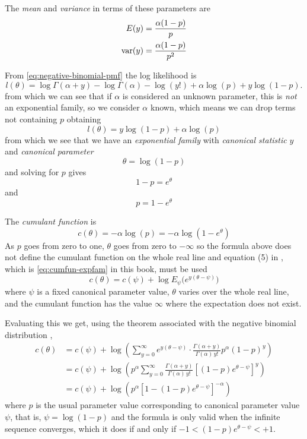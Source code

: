 The \emph{mean} and \emph{variance} in terms of these parameters are
\begin{align*}
   E(y) & = \frac{\alpha (1 - p)}{p}
   \\
   \operatorname{var}(y) & = \frac{\alpha (1 - p)}{p^2}
\end{align*}

From \eqref{eq:negative-binomial-pmf} the log likelihood is
$$
   l(\theta)
   =
   \log \Gamma(\alpha + y) - \log \Gamma(\alpha) - \log(y!)
   + \alpha \log(p) + y \log(1-p).
$$
from which we can see that if $\alpha$ is considered an unknown parameter,
this is \emph{not} an exponential family, so we consider $\alpha$ known,
which means we can drop terms not containing $p$ obtaining
$$
   l(\theta)
   =
   y \log(1 - p) + \alpha \log(p) 
$$
from which we see that we have an \emph{exponential family} with
\emph{canonical statistic} $y$ and \emph{canonical parameter}
$$
   \theta = \log(1 - p)
$$
and solving for $p$ gives
$$
   1 - p = e^\theta
$$
and
$$
   p = 1 - e^\theta
$$

The \emph{cumulant function} is
$$
   c(\theta)
   =
   - \alpha \log(p) 
   =
   - \alpha \log(1 - e^\theta)
$$
As $p$ goes from zero to one, $\theta$ goes from zero to $- \infty$ so
the formula above does not define the cumulant function on the whole real
line and equation (5) in \citet{geyer-gdor}, which is \eqref{eq:cumfun-expfam}
in this book, must be used
\begin{equation*}
   c(\theta) = c(\psi) +
   \log E_{\psi}\bigl( e^{y (\theta - \psi)} \bigr)
\end{equation*}
where $\psi$ is a fixed canonical parameter value, $\theta$ varies
over the whole real line, and the cumulant function has the value $\infty$
where the expectation does not exist.

Evaluating this we get, using the theorem associated with the negative
binomial distribution \citep{brand-name-distributions},
\begin{equation} \label{eq:negative-binomial-cumfun-derivation}
\begin{split}
   c(\theta)
   & =
   c(\psi) +
   \log \left( \sum_{y = 0}^\infty
   e^{y (\theta - \psi)} \cdot
   \frac{\Gamma(\alpha + y)}{\Gamma(\alpha) \, y!} p^\alpha (1-p)^y
   \right)
   \\
   & =
   c(\psi) +
   \log \left(
   p^\alpha
   \sum_{y = 0}^\infty
   \frac{\Gamma(\alpha + y)}{\Gamma(\alpha) \, y!}
   \left[ (1-p) e^{\theta - \psi} \right]^y
   \right)
   \\
   & =
   c(\psi) +
   \log \left(
   p^\alpha
   \left[ 1 - (1-p) e^{\theta - \psi} \right]^{- \alpha}
   \right)
\end{split}
\end{equation}
where $p$ is the usual parameter value corresponding to canonical parameter
value $\psi$, that is, $\psi = \log(1 - p)$ and the formula is only valid
when the infinite sequence converges, which it does if and only if
$-1 < (1-p) e^{\theta - \psi} < +1$.

